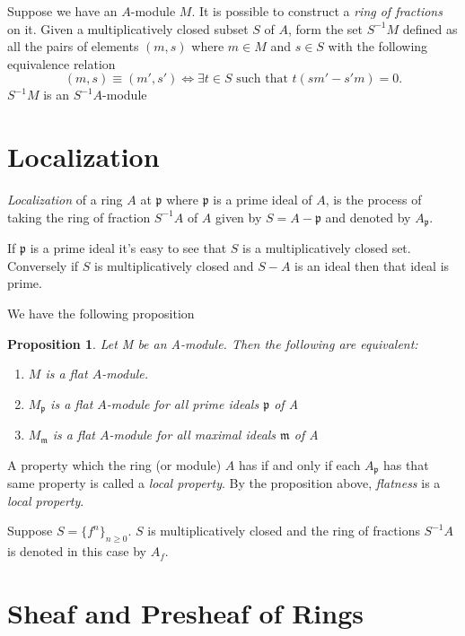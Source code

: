 \documentclass[]{report}
\newtheorem{prop}[theorem]{Proposition}
\newcommand\byS{S^{-1}}
\newcommand\mfk[1]{\mathfrak{#1}}
\begin{document}
    Suppose we have an $A$-module $M$. It is possible to construct a \textit{ring of fractions} on it. Given a multiplicatively closed subset $S$ of $A$, form the set $\byS M$ defined as all the pairs of elements $(m,s)$ where $m \in M$ and $s \in S$ with the following equivalence relation 
    $$(m,s) \equiv (m', s') \Leftrightarrow \exists t \in S \text{ such that } t(sm' - s'm) = 0.$$
$\byS M$ is an $\byS A$-module

\section{Localization}

\textit{Localization} of a ring $A$ at $\mfk{p}$ where $\mfk{p}$ is a prime ideal of $A$, is the process of taking the ring of fraction $\byS A$ of $A$ given by $S = A - \mfk{p}$ and denoted by $A_\mfk{p}$.

If $\mfk{p}$ is a prime ideal it's easy to see that $S$ is a multiplicatively closed set. Conversely if $S$ is multiplicatively closed and $S - A$ is an ideal then that ideal is prime.

We have the following proposition
\begin{prop}
    Let M be an A-module. Then the following are equivalent:
    \begin{enumerate}
        \item $M$ is a flat $A$-module.
        \item $M_\mathfrak{p}$ is a flat $A$-module for all prime ideals $\mathfrak{p}$ of A
        \item $M_\mathfrak{m}$ is a flat $A$-module for all maximal ideals $\mathfrak{m}$ of A
    \end{enumerate}
\end{prop}

    A property which the ring (or module) $A$ has if and only if each $A_\mfk{p}$ has that same property is called a \textit{local property}. By the proposition above, \textit{flatness} is a \textit{local property}.

Suppose $S = \{f^n\}_{n\geq 0}$. $S$ is multiplicatively closed and the ring of fractions $\byS A$ is denoted in this case by $A_f$.

\section{Sheaf and Presheaf of Rings}
\end{document}
